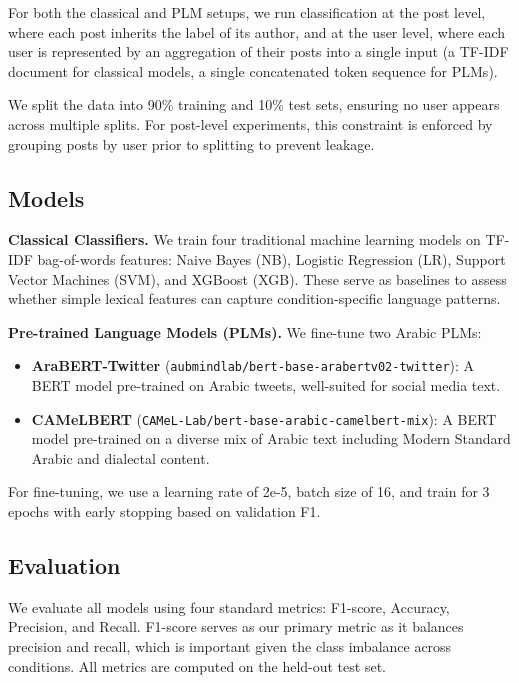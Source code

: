 \documentclass[11pt]{article}
\begin{document}
For both the classical and PLM setups, we run classification at the post level, where each post inherits the label of its author, and at the user level, where each user is represented by an aggregation of their posts into a single input (a TF-IDF document for classical models, a single concatenated token sequence for PLMs).

We split the data into 90\% training and 10\% test sets, ensuring no user appears across multiple splits. For post-level experiments, this constraint is enforced by grouping posts by user prior to splitting to prevent leakage.


\subsection{Models}
\label{subsec:models}

\textbf{Classical Classifiers.} We train four traditional machine learning models on TF-IDF bag-of-words features: Naive Bayes (NB), Logistic Regression (LR), Support Vector Machines (SVM), and XGBoost (XGB). These serve as baselines to assess whether simple lexical features can capture condition-specific language patterns.

\textbf{Pre-trained Language Models (PLMs).} We fine-tune two Arabic PLMs:
\begin{itemize}
    \item \textbf{AraBERT-Twitter} (\texttt{aubmindlab/bert-base-arabertv02-twitter}): A BERT model pre-trained on Arabic tweets, well-suited for social media text.
    \item \textbf{CAMeLBERT} (\texttt{CAMeL-Lab/bert-base-arabic-camelbert-mix}): A BERT model pre-trained on a diverse mix of Arabic text including Modern Standard Arabic and dialectal content.
\end{itemize}
For fine-tuning, we use a learning rate of 2e-5, batch size of 16, and train for 3 epochs with early stopping based on validation F1.

\subsection{Evaluation}
\label{subsec:eval}

We evaluate all models using four standard metrics: F1-score, Accuracy, Precision, and Recall. F1-score serves as our primary metric as it balances precision and recall, which is important given the class imbalance across conditions. All metrics are computed on the held-out test set.
\end{document}

